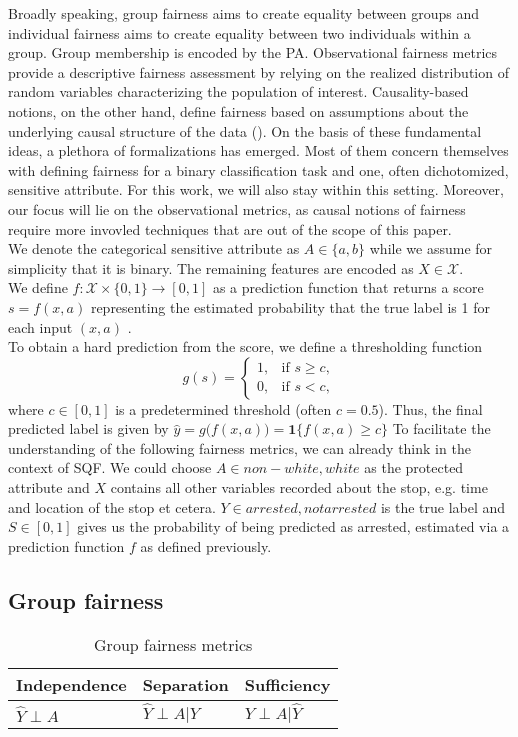 Broadly speaking, group fairness aims to create equality between groups and individual fairness aims to create equality between two individuals within a group. Group membership is encoded by the PA. Observational fairness metrics provide a descriptive fairness assessment by relying on the realized distribution of random variables characterizing the population of interest. Causality-based notions, on the other hand, define fairness based on assumptions about the underlying causal structure of the data (\cite{castelnovo2022}).
On the basis of these fundamental ideas, a plethora of formalizations has emerged. Most of them concern themselves with defining fairness for a binary classification task and one, often dichotomized, sensitive attribute. For this work, we will also stay within this setting. Moreover, our focus will lie on the observational metrics, as causal notions of fairness require more invovled techniques that are out of the scope of this paper.\\
We denote the categorical sensitive attribute as $A \in \{a,b\}$ while we assume for simplicity that it is binary. The remaining features are encoded as $X \in \mathcal{X}$.\\
We define $f : \mathcal{X} \times \{0,1\} \to [0,1]$ as a prediction function that returns a score \(s = f(x, a)\) representing the estimated probability that the true label is 1 for each input $(x, a)$ .\\
To obtain a hard prediction from the score, we define a thresholding function
$$ g(s) = \begin{cases} 
1, & \text{if } s \ge c, \\
0, & \text{if } s < c,
\end{cases}$$
where \(c \in [0,1]\) is a predetermined threshold (often \(c = 0.5\)).
Thus, the final predicted label is given by $\hat{y} = g\bigl(f(x, a)\bigr) = \mathbf{1}\{f(x, a) \ge c\}$
To facilitate the understanding of the following fairness metrics, we can already think in the context of SQF. We could choose $A \in {non-white, white}$ as the protected attribute and $X$ contains all other variables recorded about the stop, e.g. time and location of the stop et cetera. $Y \in {arrested, not arrested}$ is the true label and $S \in [0,1]$ gives us the probability of being predicted as arrested, estimated via a prediction function $f$ as defined previously. 
\subsection{Group fairness}
\label{sec:groupFairnessChapter}
\begin{table}
    \centering
    \begin{tabular}{lll}
        \toprule
        Independence & Separation & {Sufficiency} \\
        \midrule
        $\hat{Y} \perp A$ & $\hat{Y} \perp A | Y$ & {$Y \perp A | \hat{Y}$}\\
        \bottomrule
    \end{tabular}
    \caption{Group fairness metrics}
    \label{tab:groupFairness}
\end{table}

